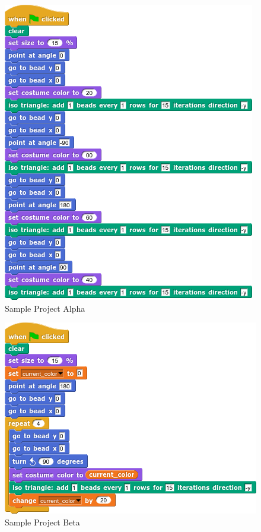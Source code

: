 \documentclass[]{article}
\begin{document}
\begin{figure}[h]
	\caption{Sample Project Alpha}
	\label{alpha}
	\centering
	\includegraphics{sample_csnap_applications/alpha.png}
\end{figure}

\begin{figure}[h]
	\caption{Sample Project Beta}
	\label{beta}
	\centering
	\includegraphics{sample_csnap_applications/beta.png}
\end{figure}
\end{document}
